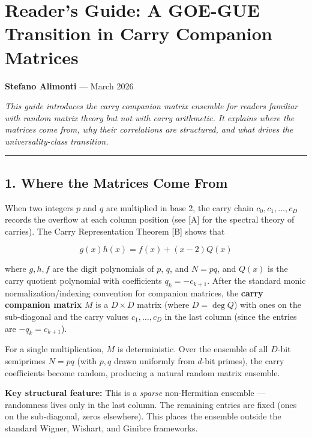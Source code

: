 \documentclass[
  11pt,
]{article}
\author{Stefano Alimonti --- stefalimonti@gmail.com}
\date{March 2026}
\begin{document}
{
\hypersetup{linkcolor=black}
\setcounter{tocdepth}{2}
\tableofcontents
}
\section{Reader's Guide: A GOE-GUE Transition in Carry Companion
Matrices}\label{readers-guide-a-goe-gue-transition-in-carry-companion-matrices}

\textbf{Stefano Alimonti} --- March 2026

\emph{This guide introduces the carry companion matrix ensemble for readers
familiar with random matrix theory but not with carry arithmetic. It explains
where the matrices come from, why their correlations are structured, and what
drives the universality-class transition.}

\begin{center}\rule{0.5\linewidth}{0.5pt}\end{center}

\newpage

\subsection{1. Where the Matrices Come From}\label{where-the-matrices-come-from}

When two integers \(p\) and \(q\) are multiplied in base 2, the carry chain
\(c_0, c_1, \ldots, c_D\) records the overflow at each column position (see
{[}A{]} for the spectral theory of carries). The Carry Representation Theorem
{[}B{]} shows that

\[g(x) h(x) = f(x) + (x - 2) Q(x)\]

where \(g, h, f\) are the digit polynomials of \(p\), \(q\), and \(N = pq\), and
\(Q(x)\) is the carry quotient polynomial with coefficients \(q_k = -c_{k+1}\).
After the standard monic normalization/indexing convention for companion
matrices, the \textbf{carry companion matrix} \(M\) is a \(D \times D\) matrix
(where \(D = \deg Q\)) with ones on the sub-diagonal and the carry values
\(c_1, \ldots, c_D\) in the last column (since the entries are
\(-q_k = c_{k+1}\)).

For a single multiplication, \(M\) is deterministic. Over the ensemble of all
\(D\)-bit semiprimes \(N = pq\) (with \(p, q\) drawn uniformly from \(d\)-bit
primes), the carry coefficients become random, producing a natural random matrix
ensemble.

\textbf{Key structural feature:} This is a \emph{sparse} non-Hermitian ensemble
--- randomness lives only in the last column. The remaining entries are fixed
(ones on the sub-diagonal, zeros elsewhere). This places the ensemble outside
the standard Wigner, Wishart, and Ginibre frameworks.
\end{document}
